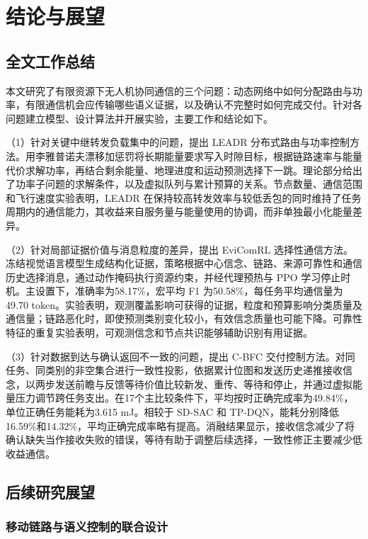 \chapter{结论与展望}
\label{ch:conclusion}

\section{全文工作总结}

本文研究了有限资源下无人机协同通信的三个问题：动态网络中如何分配路由与功率，有限通信机会应传输哪些语义证据，以及确认不完整时如何完成交付。针对各问题建立模型、设计算法并开展实验，主要工作和结论如下。

（1）针对关键中继转发负载集中的问题，提出 LEADR 分布式路由与功率控制方法。用李雅普诺夫漂移加惩罚将长期能量要求写入时隙目标，根据链路速率与能量代价求解功率，再结合剩余能量、地理进度和运动预测选择下一跳。理论部分给出了功率子问题的求解条件，以及虚拟队列与累计预算的关系。节点数量、通信范围和飞行速度实验表明，LEADR 在保持较高转发效率与较低丢包的同时维持了任务周期内的通信能力，其收益来自服务量与能量使用的协调，而非单独最小化能量差异。

（2）针对局部证据价值与消息粒度的差异，提出 EviComRL 选择性通信方法。冻结视觉语言模型生成结构化证据，策略根据中心信念、链路、来源可靠性和通信历史选择消息，通过动作掩码执行资源约束，并经代理预热与 PPO 学习停止时机。主设置下，准确率为58.17\%，宏平均 F1 为50.58\%，每任务平均通信量为49.70 token。实验表明，观测覆盖影响可获得的证据，粒度和预算影响分类质量及通信量；链路恶化时，即使预测类别变化较小，有效信念质量也可能下降。可靠性特征的重复实验表明，可观测信念和节点共识能够辅助识别有用证据。

（3）针对数据到达与确认返回不一致的问题，提出 C-BFC 交付控制方法。对同任务、同类别的非空集合进行一致性投影，依据累计位图和发送历史递推接收信念，以两步发送前瞻与反馈等待价值比较新发、重传、等待和停止，并通过虚拟能量压力调节跨任务支出。在17个主比较条件下，平均按时正确完成率为49.84\%，单位正确任务能耗为3.615 mJ。相较于 SD-SAC 和 TP-DQN，能耗分别降低16.59\%和14.32\%，平均正确完成率略有提高。消融结果显示，接收信念减少了将确认缺失当作接收失败的错误，等待有助于调整后续选择，一致性修正主要减少低收益通信。

\section{后续研究展望}

\subsection{移动链路与语义控制的联合设计}

